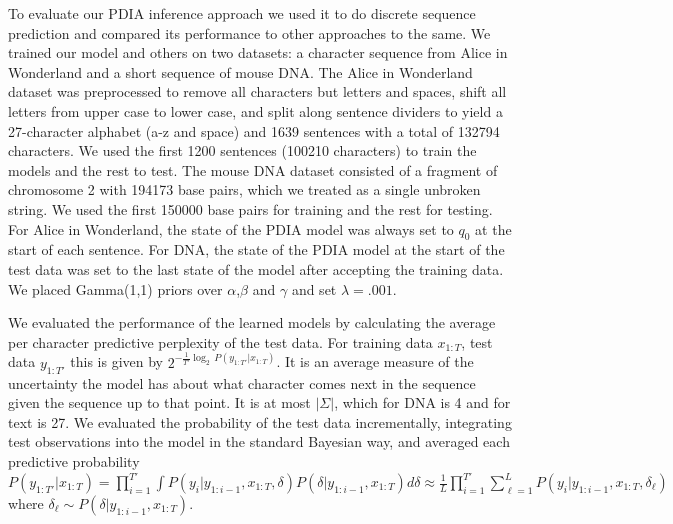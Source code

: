 To evaluate our PDIA inference approach we used it to do discrete sequence prediction and compared its performance to other approaches to the same.  We trained our model and others on two datasets: a character sequence from Alice in Wonderland and a short sequence of mouse DNA.  The Alice in Wonderland dataset was preprocessed to remove all characters but letters and spaces, shift all letters from upper case to lower case, and split along sentence dividers to yield a 27-character alphabet (a-z and space) and 1639 sentences with a total of 132794 characters.  We used the first 1200 sentences (100210 characters) to train the models and the rest to test.    The mouse DNA dataset consisted of a fragment of chromosome 2 with 194173 base pairs, which we treated as a single unbroken string.  We used the first 150000 base pairs for training and the rest for testing.  For Alice in Wonderland, the state of the PDIA model was always set to $q_0$ at the start of each sentence.  For DNA, the state of the PDIA model at the start of the test data was set to the last state of the model after accepting the training data.  We placed Gamma(1,1) priors over $\alpha$,$\beta$ and $\gamma$ and set $\lambda=.001.$

We evaluated the performance of the learned models by calculating the average per character predictive perplexity of the test data.  For training data $x_{1:T}$, test data $y_{1:T'}$ this is given by $2^{-\frac{1}{T'}\log_2\, P(y_{1:T'}|x_{1:T})}$.  It is an average measure of the uncertainty the model has about what character comes next in the sequence given the sequence up to that point. It is at most $|\Sigma|$, which for DNA is 4 and for text is 27.  We evaluated the probability of the test data incrementally, integrating test observations into the model in the standard Bayesian way, and averaged each predictive probability $P(y_{1:T'}|x_{1:T}) =  \prod_{i = 1}^{T'} \int P(y_i|y_{1:i-1},x_{1:T},\delta)P(\delta|y_{1:i-1},x_{1:T})d\delta \approx \frac{1}{L}\prod_{i = 1}^{T'} \sum_{\ell = 1}^{L} P(y_i|y_{1:i-1},x_{1:T},\delta_\ell)$ where $\delta_\ell \sim P(\delta|y_{1:i-1},x_{1:T})$.  %

